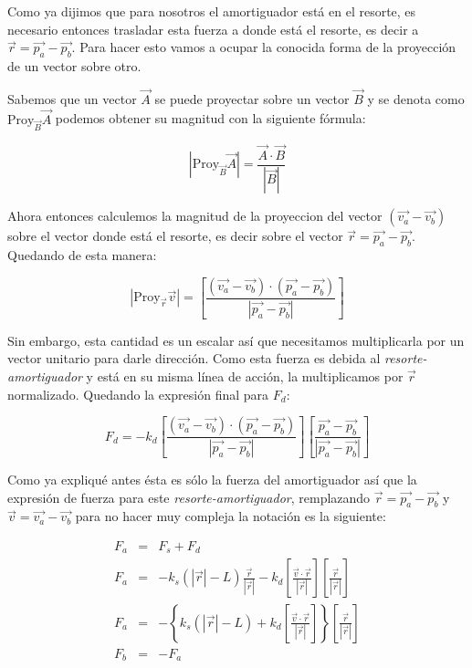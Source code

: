 Como ya dijimos que para nosotros el amortiguador está en el resorte, es necesario entonces trasladar esta fuerza a donde está el resorte, es decir a $\vec{r} = \vec{p_a} - \vec{p_b}$. Para hacer esto vamos a ocupar la conocida forma de la proyección de un vector sobre otro.

Sabemos que un vector $\vec{A}$ se puede proyectar sobre un vector $\vec{B}$ y se denota como $\mathrm{Proy}_{ \vec{B} } \vec{A}$ podemos obtener su magnitud con la siguiente fórmula:

\begin{equation}
| \mathrm{Proy}_{\vec{B}} \vec{A} | = \frac{ \vec{A} \cdot \vec{B} }{| \vec{B} |}
\end{equation}

Ahora entonces calculemos la magnitud de la proyeccion del vector $\left( \vec{v_a} - \vec{v_b} \right)$ sobre el vector donde está el resorte, es decir sobre el vector $\vec{r} = \vec{p_a} - \vec{p_b}$. Quedando de esta manera:

\begin{equation}
 | \mathrm{Proy}_{ \vec{r} } \vec{v} | = \left[ \frac{ ( \vec{v_a} - \vec{v_b} ) \cdot ( \vec{p_a} - \vec{p_b} ) }{ | \vec{p_a} - \vec{p_b} | } \right]
\end{equation}

Sin embargo, esta cantidad es un escalar así que necesitamos multiplicarla por un vector unitario para darle dirección. Como esta fuerza es debida al \emph{resorte-amortiguador} y está en su misma línea de acción, la multiplicamos por $\vec{r}$ normalizado. Quedando la expresión final para $F_d$:

\begin{equation}
F_d = - k_d \left[ \frac{ ( \vec{v_a} - \vec{v_b} ) \cdot ( \vec{p_a} - \vec{p_b} ) } { | \vec{p_a} - \vec{p_b} |} \right] \left[ \frac{ \vec{p_a} - \vec{p_b} } { | \vec{p_a} - \vec{p_b} |} \right]
\end{equation}

Como ya expliqué antes ésta es sólo la fuerza del amortiguador así que la expresión de fuerza para este \emph{resorte-amortiguador}, remplazando $\vec{r} = \vec{p_a} - \vec{p_b}$ y $\vec{v} = \vec{v_a} - \vec{v_b}$ para no hacer muy compleja la notación es la siguiente:

\begin{eqnarray}
F_a & = & F_s + F_d \nonumber \\
F_a & = & -k_s \left( |\vec{r}| - L \right) \frac{\vec{r}}{|\vec{r}|} - k_d \left[ \frac{ \vec{v} \cdot \vec{r} }{ |\vec{r}|} \right] \left[ \frac{\vec{r}} {|\vec{r}|}\right] \nonumber \\
\label{fuerzaResorte}
F_a & = & - \left\{ k_s \left( |\vec{r}| - L \right) + k_d \left[ \frac{ \vec{v} \cdot \vec{r} }{ |\vec{r}|} \right] \right\} \left[ \frac{\vec{r}} {|\vec{r}|} \right] \\
F_b & = & -F_a \nonumber
\end{eqnarray}


